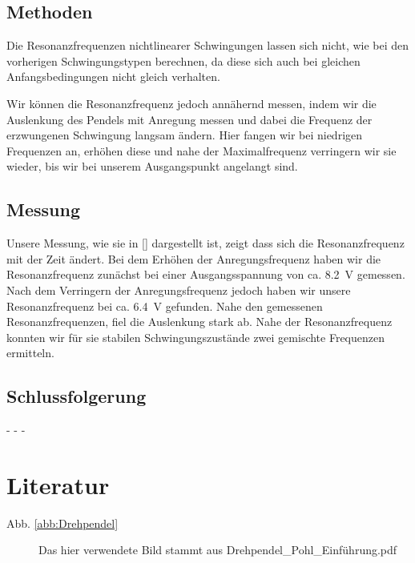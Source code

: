 \documentclass[11pt,a4paper,titlepage, ngerman]{article}
\newcommand{\refabb}[1]{Abb. \ref{abb:#1}}
\begin{document}
		\subsection*{Methoden}
				
			Die Resonanzfrequenzen nichtlinearer Schwingungen lassen sich nicht, wie bei den vorherigen Schwingungstypen berechnen, da diese sich auch bei gleichen Anfangsbedingungen nicht gleich verhalten.
			
			Wir können die Resonanzfrequenz jedoch annähernd messen, indem wir die Auslenkung des Pendels mit Anregung messen und dabei die Frequenz der erzwungenen Schwingung langsam ändern.
			Hier fangen wir bei niedrigen Frequenzen an, erhöhen diese und nahe der Maximalfrequenz verringern wir sie wieder, bis wir bei unserem Ausgangspunkt angelangt sind.
		
		\subsection*{Messung}
			
			Unsere Messung, wie sie in \ref{} dargestellt ist, zeigt dass sich die Resonanzfrequenz mit der Zeit ändert. Bei dem Erhöhen der Anregungsfrequenz haben wir die Resonanzfrequenz zunächst bei einer Ausgangsspannung von ca. \SI{8,2}{\V} gemessen. Nach dem Verringern der Anregungsfrequenz jedoch haben wir unsere Resonanzfrequenz bei ca. \SI{6,4}{\V} gefunden. Nahe den gemessenen Resonanzfrequenzen, fiel die Auslenkung stark ab.
			Nahe der Resonanzfrequenz konnten wir für sie stabilen Schwingungszustände zwei gemischte Frequenzen ermitteln. %
			
		\subsection*{Schlussfolgerung}
			
			- - -

	\vspace{1cm}		
	\section*{Literatur}
		\begin{description}
			\item[\refabb{Drehpendel}] Das hier verwendete Bild stammt aus \glqq Drehpendel\_Pohl\_Einführung.pdf\grqq
		\end{description}
\end{document}
